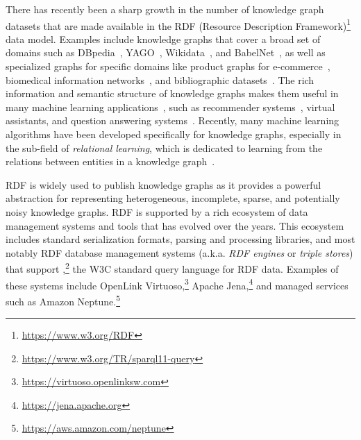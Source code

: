 
There has recently been a sharp growth in the number of knowledge graph datasets that are made available in the RDF (Resource Description Framework)\footnote{\url{https://www.w3.org/RDF}} data model.
Examples include knowledge graphs that cover a broad set of domains such as DBpedia~\cite{lehmann2015dbpedia}, YAGO~\cite{yago2}, Wikidata~\cite{vrandecic12wikidata},
and BabelNet~\cite{Navigli:2012:BAC:2397213.2397579}, 
as well as specialized graphs for specific domains like %
product graphs for e-commerce~\cite{Dong:2018:CIB:3219819.3219938}, biomedical information networks~\cite{belleau2008bio2rdf}, %
and bibliographic datasets~\cite{mccallum2000automating, giles1998citeseer}.
The rich information and semantic structure of knowledge graphs makes them 
useful in many machine learning applications~\cite{davis1993knowledge},
such as recommender systems~\cite{jenatton2012latent},
virtual assistants, and question answering systems~\cite{west2014knowledge}.
Recently, many machine learning algorithms have been developed specifically for %
knowledge graphs,
especially in the sub-field of \textit{relational learning}, which is dedicated to learning from
the 
relations between entities in a knowledge graph~\cite{nickel2015review, nguyen2017overview, wang2018multi}.

RDF is widely used to publish knowledge graphs as it provides a powerful abstraction for representing heterogeneous, incomplete, sparse, and potentially noisy knowledge graphs. RDF is supported by a rich ecosystem of data management systems and tools that has evolved over the years.
This ecosystem includes standard serialization formats, parsing and processing libraries,
and most notably RDF database management systems (a.k.a. \textit{RDF engines} or \textit{triple stores}) that support \sparql,\footnote{\url{https://www.w3.org/TR/sparql11-query}}
the W3C standard query language for RDF data.
Examples of these systems include
OpenLink Virtuoso,\footnote{\url{https://virtuoso.openlinksw.com}}
Apache Jena,\footnote{\url{https://jena.apache.org}}
and
managed services such as
Amazon Neptune.\footnote{\url{https://aws.amazon.com/neptune}}

